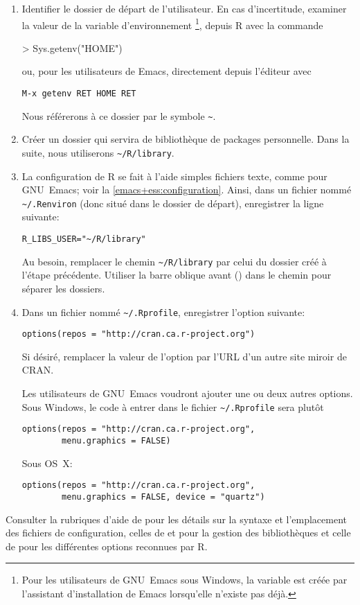 \begin{enumerate}
\item Identifier le dossier de départ de l'utilisateur. En cas
  d'incertitude, examiner la valeur de la variable d'environnement
  \footnote{%
    Pour les utilisateurs de GNU~Emacs sous Windows, la variable est
    créée par l'assistant d'installation de Emacs lorsqu'elle n'existe
    pas déjà.}, %
  depuis R avec la commande
\begin{Schunk}
\begin{Sinput}
> Sys.getenv("HOME")
\end{Sinput}
\end{Schunk}
  ou, pour les utilisateurs de Emacs, directement depuis l'éditeur avec
\begin{verbatim}
M-x getenv RET HOME RET
\end{verbatim}
  Nous référerons à ce dossier par le symbole \verb=~=.
\item Créer un dossier qui servira de bibliothèque de packages
  personnelle. Dans la suite, nous utiliserons \verb=~/R/library=.
\item La configuration de R se fait à l'aide simples fichiers texte,
  comme pour GNU~Emacs; voir la \autoref{emacs+ess:configuration}.
  Ainsi, dans un fichier nommé \verb=~/.Renviron= (donc situé dans le
  dossier de départ), enregistrer la ligne suivante:
\begin{verbatim}
R_LIBS_USER="~/R/library"
\end{verbatim}
  Au besoin, remplacer le chemin \verb=~/R/library= par celui du
  dossier créé à l'étape précédente. Utiliser la barre oblique avant
  (\code{/}) dans le chemin pour séparer les dossiers.
\item Dans un fichier nommé \verb=~/.Rprofile=, enregistrer l'option
  suivante:
\begin{verbatim}
options(repos = "http://cran.ca.r-project.org")
\end{verbatim}
  Si désiré, remplacer la valeur de l'option  par l'URL
  d'un autre site miroir de CRAN.

  Les utilisateurs de GNU~Emacs voudront ajouter une ou deux autres
  options. Sous Windows, le code à entrer dans le fichier
  \verb=~/.Rprofile= sera plutôt
\begin{verbatim}
options(repos = "http://cran.ca.r-project.org",
        menu.graphics = FALSE)
\end{verbatim}
  Sous OS~X:
\begin{verbatim}
options(repos = "http://cran.ca.r-project.org",
        menu.graphics = FALSE, device = "quartz")
\end{verbatim}
\end{enumerate}
Consulter la rubriques d'aide de  pour les détails sur
la syntaxe et l'emplacement des fichiers de configuration, celles de
 et  pour la gestion des bibliothèques
et celle de  pour les différentes options reconnues par
R.

